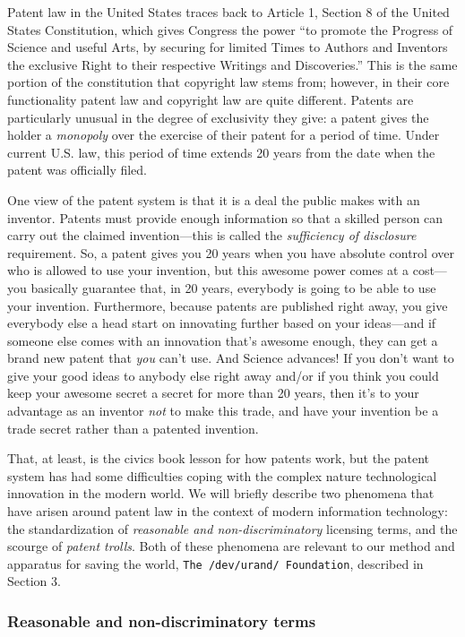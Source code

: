 \documentclass[acmtocl]%
{boviktrans}
\begin{document}
Patent law in the United States traces back to Article 1, Section 8 of
the United States Constitution, which gives Congress the power ``to
promote the Progress of Science and useful Arts, by securing for
limited Times to Authors and Inventors the exclusive Right to their
respective Writings and Discoveries.'' This is the same portion of the
constitution that copyright law stems from; however, in their core
functionality patent law and copyright law are quite
different. Patents are particularly unusual in the degree of
exclusivity they give: a patent gives the holder a {\it monopoly} over
the exercise of their patent for a period of time. Under current U.S.
law, this period of time extends 20 years from the date when the
patent was officially filed.

One view of the patent system is that it is a deal the public makes
with an inventor. Patents must provide enough information so that a
skilled person can carry out the claimed invention---this is called
the {\it sufficiency of disclosure} requirement.  So, a patent gives
you 20 years when you have absolute control over who is allowed to use
your invention, but this awesome power comes at a cost---you
basically guarantee that, in 20 years, everybody is going to be able
to use your invention. Furthermore, because patents are published
right away, you give everybody else a head start on innovating further
based on your ideas---and if someone else comes with an innovation
that's awesome enough, they can get a brand new patent that {\it you}
can't use. And Science advances!  If you don't want to give your good
ideas to anybody else right away and/or if you think you could keep
your awesome secret a secret for more than 20 years, then it's to your
advantage as an inventor {\it not} to make this trade, and have your
invention be a trade secret rather than a patented invention.

That, at least, is the civics book lesson for how patents work, but
the patent system has had some difficulties coping with the complex
nature technological innovation in the modern world. We will briefly
describe two phenomena \cite{dododododod} that have arisen around
patent law in the context of modern information technology: the
standardization of {\it reasonable and non-discriminatory} licensing
terms, and the scourge of {\it patent trolls}. Both of these phenomena
\cite{dododododod} are relevant to our method and apparatus for saving
the world, {\tt The /dev/urand/ Foundation}, described in Section 3.

\subsubsection{Reasonable and non-discriminatory terms}
\label{sec:rand}
\end{document}

